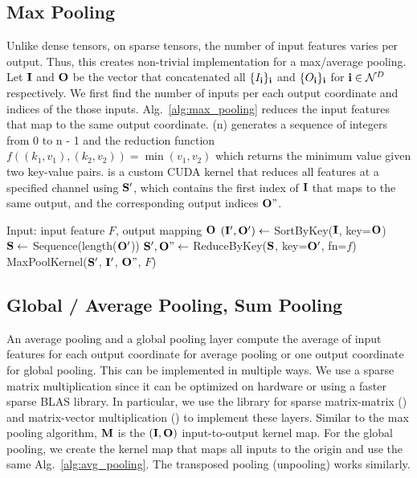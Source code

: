 \subsection{Max Pooling}

Unlike dense tensors, on sparse tensors, the number of input features varies per output. Thus, this creates non-trivial implementation for a max/average pooling. Let $\mathbf{I}$ and $\mathbf{O}$ be the vector that concatenated all $\{I_{\mathbf{i}}\}_{\mathbf{i}}$ and $\{O_{\mathbf{i}}\}_{\mathbf{i}}$ for $\mathbf{i} \in \mathcal{N}^D$ respectively. We first find the number of inputs per each output coordinate and indices of the those inputs. Alg.~\ref{alg:max_pooling} reduces the input features that map to the same output coordinate. (n) generates a sequence of integers from 0 to n - 1 and the reduction function $f((k_1, v_1), (k_2, v_2)) = \min(v_1, v_2)$ which returns the minimum value given two key-value pairs.  is a custom CUDA kernel that reduces all features at a specified channel using $\mathbf{S}'$, which contains the first index of $\mathbf{I}$ that maps to the same output, and the corresponding output indices $\mathbf{O}"$.
\begin{algorithm}
  \caption{GPU Sparse Tensor MaxPooling}
  \label{alg:max_pooling}
\begin{algorithmic}
  \State Input: input feature $F$, output mapping $\mathbf{O}$
  \State $(\mathbf{I}', \mathbf{O}') \leftarrow$ SortByKey($\mathbf{I}$, key=$\mathbf{O}$)
  \State $\mathbf{S} \leftarrow$ Sequence(length($\mathbf{O}'$))
  \State $\mathbf{S}', \mathbf{O}" \leftarrow$ ReduceByKey($\mathbf{S}$, key=$\mathbf{O}'$, fn=$f$)
  \State \Return MaxPoolKernel($\mathbf{S}'$, $\mathbf{I}'$, $\mathbf{O}"$, $F$)
\end{algorithmic}
\end{algorithm}

\subsection{Global / Average Pooling, Sum Pooling}

An average pooling and a global pooling layer compute the average of input features for each output coordinate for average pooling or one output coordinate for global pooling. This can be implemented in multiple ways. We use a sparse matrix multiplication since it can be optimized on hardware or using a faster sparse BLAS library. In particular, we use the  library for sparse matrix-matrix () and matrix-vector multiplication () to implement these layers. Similar to the max pooling algorithm, $\mathbf{M}$ is the $(\mathbf{I}, \mathbf{O})$ input-to-output kernel map. For the global pooling, we create the kernel map that maps all inputs to the origin and use the same Alg.~\ref{alg:avg_pooling}. The transposed pooling (unpooling) works similarly.

